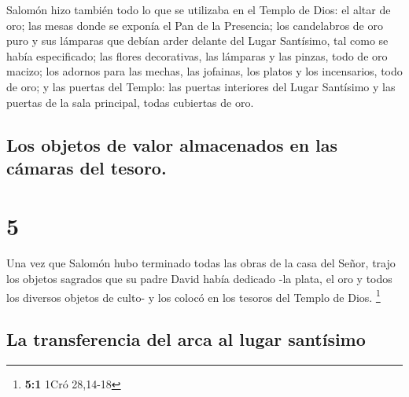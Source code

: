  Salomón hizo también todo lo que se utilizaba en el
Templo de Dios: el altar de oro; las mesas donde se exponía el Pan de la
Presencia;  los candelabros de oro puro y sus lámparas
que debían arder delante del Lugar Santísimo, tal como se había
especificado;  las flores decorativas, las lámparas y las
pinzas, todo de oro macizo;  los adornos para las mechas,
las jofainas, los platos y los incensarios, todo de oro; y las puertas
del Templo: las puertas interiores del Lugar Santísimo y las puertas de
la sala principal, todas cubiertas de oro.

\hypertarget{los-objetos-de-valor-almacenados-en-las-cuxe1maras-del-tesoro.}{%
\subsection{Los objetos de valor almacenados en las cámaras del
tesoro.}\label{los-objetos-de-valor-almacenados-en-las-cuxe1maras-del-tesoro.}}

\hypertarget{section-4}{%
\section{5}\label{section-4}}

 Una vez que Salomón hubo terminado todas las obras de la
casa del Señor, trajo los objetos sagrados que su padre David había
dedicado -la plata, el oro y todos los diversos objetos de culto- y los
colocó en los tesoros del Templo de Dios. \footnote{\textbf{5:1} 1Cró
  28,14-18}

\hypertarget{la-transferencia-del-arca-al-lugar-santuxedsimo}{%
\subsection{La transferencia del arca al lugar
santísimo}\label{la-transferencia-del-arca-al-lugar-santuxedsimo}}

